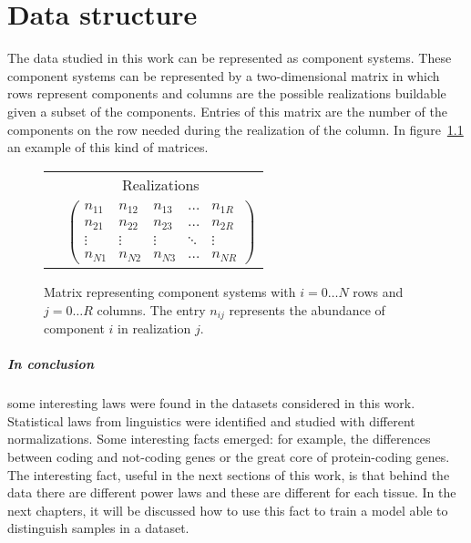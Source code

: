 \chapter{Data structure}\label{ch:structure}
The data studied in this work can be represented as component systems. These component systems can be represented by a two-dimensional matrix in which rows represent components and columns are the possible realizations buildable given a subset of the components. Entries of this matrix are the number of the components on the row needed during the realization of the column. In figure~\ref{fig:componetstable} an example of this kind of matrices.
\begin{figure}[htb!]
	\centering
	\begin{tabular}{cc}
		&Realizations\\
		\rotatebox[origin=c]{90}{Components}&
		$\left(\begin{array}{ccccc}{n_{11}} & {n_{12}} & {n_{13}} & {\dots} & {n_{1 R}} \\ {n_{2 1}} & {n_{2 2}} & {n_{2 3}} & {\dots} & {n_{2 R}} \\ {\vdots} & {\vdots} & {\vdots} & {\ddots} & {\vdots} \\ {n_{N 1}} & {n_{N 2}} & {n_{N 3}} & {\dots} & {n_{N R}}\end{array}\right)$\\
	\end{tabular}
	\caption{Matrix representing component systems with $i=0\dots N$ rows and $j=0\dots R$ columns. The entry $n_{i j}$ represents the abundance of component $i$ in realization $j$.}
	\label{fig:componetstable}
\end{figure}







\FloatBarrier


\paragraph{In conclusion} some interesting laws were found in the datasets considered in this work. Statistical laws from linguistics were identified and studied with different normalizations. Some interesting facts emerged: for example, the differences between coding and not-coding genes or the great core of protein-coding genes. The interesting fact, useful in the next sections of this work, is that behind the data there are different power laws and these are different for each tissue. In the next chapters, it will be discussed how to use this fact to train a model able to distinguish samples in a dataset. 